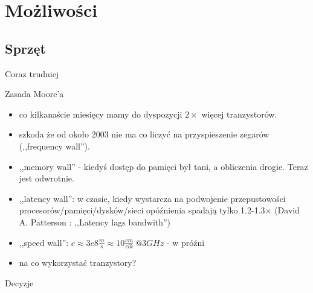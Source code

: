 \section{Możliwości} %
\subsection{Sprzęt}
\begin{frame}{Coraz trudniej}
	\begin{block}{Zasada Moore'a}
		\begin{itemize}
			\item co kilkanaście miesięcy mamy do dyspozycji $2\times$ więcej tranzystorów.
			\item szkoda że od około 2003 nie ma co liczyć na przyspieszenie zegarów (,,frequency wall'').
			\item ,,memory wall'' - kiedyś dostęp do pamięci był tani, a obliczenia drogie. Teraz jest odwrotnie.
			\item ,,latency wall'': w czasie, kiedy wystarcza na podwojenie przepustowości procesorów/pamięci/dysków/sieci opóźnienia spadają tylko 1.2-1.3$\times$ (David A. Patterson : ,,Latency lags bandwith'')
			\item ,,speed wall'': $c \approx 3e8\frac{m}{s} \approx 10 \frac{cm}{clk}~@3GHz$ - w próźni
			\item na co wykorzystać tranzystory?
		\end{itemize}
	\end{block}
	\begin{block}{Decyzje}
	\end{block}
\end{frame}
